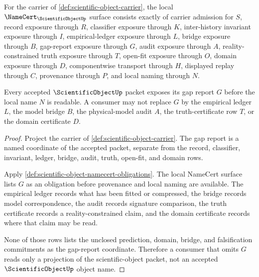 \begin{definition}
\label{def:scientific-object-namecert-obligations}
For the carrier of \autoref{def:scientific-object-carrier}, the local $\NameCert_{\ScientificObjectUp}$ surface consists exactly of carrier admission for $S$, record exposure through $R$, classifier exposure through $K$, inter-history invariant exposure through $I$, empirical-ledger exposure through $L$, bridge exposure through $B$, gap-report exposure through $G$, audit exposure through $A$, reality-constrained truth exposure through $T$, open-fit exposure through $O$, domain exposure through $D$, componentwise transport through $H$, displayed replay through $C$, provenance through $P$, and local naming through $N$.
\end{definition}

\begin{theorem}
\label{thm:scientific-object-gap-report-ledger}
Every accepted $\ScientificObjectUp$ packet exposes its gap report $G$ before the local name $N$ is readable. A consumer may not replace $G$ by the empirical ledger $L$, the model bridge $B$, the physical-model audit $A$, the truth-certificate row $T$, or the domain certificate $D$.
\end{theorem}
\begin{proof}
Project the carrier of \autoref{def:scientific-object-carrier}. The gap report is a named coordinate of the accepted packet, separate from the record, classifier, invariant, ledger, bridge, audit, truth, open-fit, and domain rows.

Apply \autoref{def:scientific-object-namecert-obligations}. The local NameCert surface lists $G$ as an obligation before provenance and local naming are available. The empirical ledger records what has been fitted or compressed, the bridge records model correspondence, the audit records signature comparison, the truth certificate records a reality-constrained claim, and the domain certificate records where that claim may be read.

None of those rows lists the unclosed prediction, domain, bridge, and falsification commitments as the gap-report coordinate. Therefore a consumer that omits $G$ reads only a projection of the scientific-object packet, not an accepted $\ScientificObjectUp$ object name.
\end{proof}

